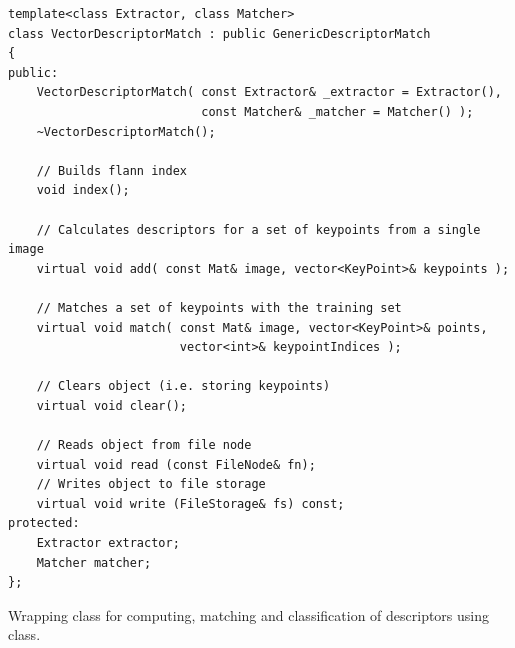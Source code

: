 \begin{lstlisting}
template<class Extractor, class Matcher>
class VectorDescriptorMatch : public GenericDescriptorMatch
{
public:
    VectorDescriptorMatch( const Extractor& _extractor = Extractor(),
                           const Matcher& _matcher = Matcher() );
    ~VectorDescriptorMatch();

	// Builds flann index
    void index();

	// Calculates descriptors for a set of keypoints from a single image
    virtual void add( const Mat& image, vector<KeyPoint>& keypoints );

    // Matches a set of keypoints with the training set
    virtual void match( const Mat& image, vector<KeyPoint>& points, 
                        vector<int>& keypointIndices );

	// Clears object (i.e. storing keypoints)
    virtual void clear();

	// Reads object from file node
    virtual void read (const FileNode& fn);
    // Writes object to file storage
    virtual void write (FileStorage& fs) const;
protected:
    Extractor extractor;
    Matcher matcher;
};
\end{lstlisting}

Wrapping class for computing, matching and classification of descriptors using  class.

